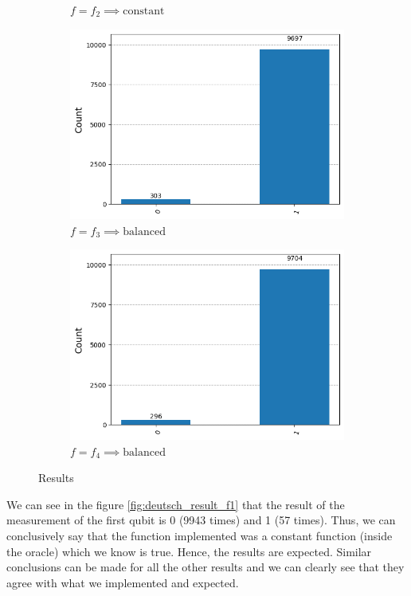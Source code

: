 \documentclass[12pt, oneside]{book}
\theoremstyle{definition}
\theoremstyle{definition}
\theoremstyle{remark}
\begin{document}
\begin{enumerate}
\begin{figure}[H]
\begin{subfigure}[b]{0.45\linewidth}
        \caption{$f=f_2\implies \text{constant}$}
        \label{fig:deutsch_result_f2}
        \end{subfigure}
        \vspace{0.5 cm}
        \begin{subfigure}[b]{0.45\linewidth}
        \centering
        \includegraphics[width=1\linewidth]{../images/deutsch_result_f3.png}
        \caption{$f=f_3\implies \text{balanced}$}
        \label{fig:deutsch_result_f3}
        \end{subfigure}
        \hfill
        \begin{subfigure}[b]{0.45\textwidth}
        \centering
        \includegraphics[width=1\linewidth]{../images/deutsch_result_f4.png}
        \caption{$f=f_4\implies \text{balanced}$}
        \label{fig:deutsch_result_f4}
        \end{subfigure}    
        \caption{Results}
        \label{fig:deutsch_results}
    \end{figure}
    We can see in the figure \ref{fig:deutsch_result_f1} that the result of the measurement of the first qubit is 0 (9943 times) and 1 (57 times). Thus, we can conclusively say that the function implemented was a constant function (inside the oracle) which we know is true. Hence, the results are expected. Similar conclusions can be made for all the other results and we can clearly see that they agree with what we implemented and expected.
\end{enumerate}
\end{document}
